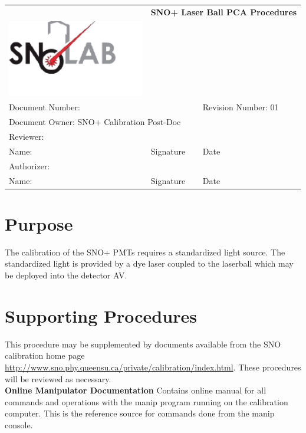 \documentclass[11pt]{article}
\begin{document}
\begin{tabular}{||l|l|l||}
\hline\hline
& \multicolumn{2}{p{8cm}||}{\bf SNO+ Laser Ball PCA Procedures} \\
\includegraphics[width=6cm]{../snolablogo.pdf} & \multicolumn{2}{p{8cm}||}{} \\
\hline
\multicolumn{2}{||p{8.5cm}|}{Document Number:} & Revision Number: 01\\
\hline
\multicolumn{3}{||l||}{Document Owner: SNO+ Calibration Post-Doc} \\
\hline
\multicolumn{3}{||l||}{Reviewer:}\\
\hline
Name: & Signature & Date \\
\hline
\multicolumn{3}{||l||}{Authorizer:}\\
\hline
Name: & Signature & Date \\
\hline\hline
\end{tabular}
\thispagestyle{empty}

\section{Purpose}

The calibration of the SNO+ PMTs requires a standardized light source. The standardized light is provided by a dye laser coupled to the laserball which may be deployed into the detector AV. 

\section{Supporting Procedures}

This procedure may be supplemented by documents available from the SNO calibration home page
\url{http://www.sno.phy.queensu.ca/private/calibration/index.html}.
These procedures will be reviewed as necessary.\\

{\bf Online Manipulator Documentation} Contains online manual for all commands and operations with the manip program running on the calibration computer. This is the reference source for commands done from the manip console.\\
\end{document}
